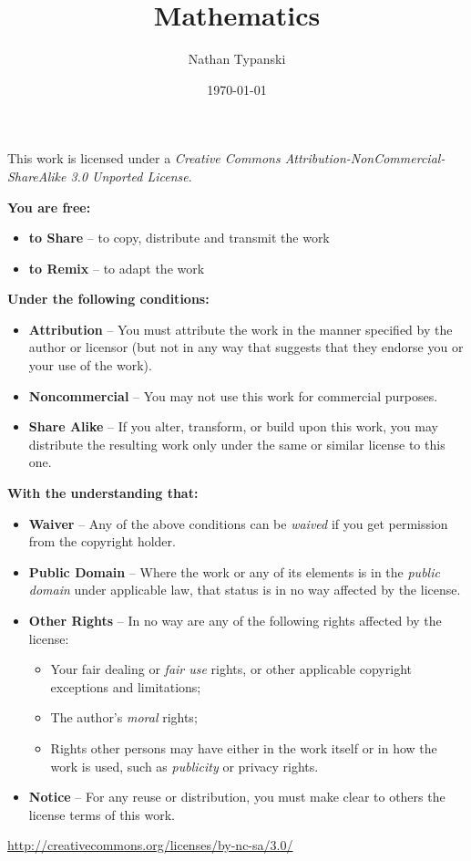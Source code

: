 \documentclass[letterpaper]{book}
\begin{document}

\title     {\textbf{
  Mathematics
}}
\author    {Nathan Typanski}
\date      {\today}
\maketitle
\newpage
\begin{center}
  \cc
\end{center}
This work is licensed under a \emph{Creative Commons Attribution-NonCommercial-ShareAlike 3.0 Unported License}.

\textbf{You are free:}
\begin{itemize}
  \item[] \textbf{to Share} -- to copy, distribute and transmit the work
  \item[] \textbf{to Remix} -- to adapt the work
\end{itemize}

\textbf{Under the following conditions:}
\begin{itemize}
  \item[]\ccby\textbf{Attribution} -- You must attribute the work in the manner specified by the author or licensor (but not in any way that suggests that they endorse you or your use of the work).
  \item[] \ccnc\textbf{Noncommercial} -- You may not use this work for commercial purposes.
  \item[] \ccsa\textbf{Share Alike} -- If you alter, transform, or build upon this work, you may distribute the resulting work only under the same or similar license to this one.
\end{itemize}

\textbf{With the understanding that:}
\begin{itemize}
  \item[]\textbf{Waiver} -- Any of the above conditions can be \emph{waived} if you get permission from the copyright holder.
  \item[]\textbf{Public Domain} -- Where the work or any of its elements is in the \emph{public domain} under applicable law, that status is in no way affected by the license.
  \item[]\textbf{Other Rights} -- In no way are any of the following rights affected by the license:
  \begin{itemize}
    \item Your fair dealing or \emph{fair use} rights, or other applicable copyright exceptions and limitations;
    \item The author's \emph{moral} rights;
    \item Rights other persons may have either in the work itself or in how the work is used, such as \emph{publicity} or privacy rights.
  \end{itemize}
  \item[]\textbf{Notice} -- For any reuse or distribution, you must make clear to others the license terms of this work.
\end{itemize}
\url{http://creativecommons.org/licenses/by-nc-sa/3.0/}

\setcounter{tocdepth}{3}
\tableofcontents
\end{document}
